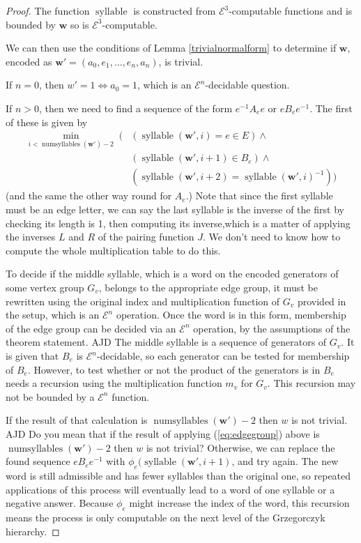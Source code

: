 \documentclass[a4paper]{article}
\newcommand{\grz}[1]{$\mathcal{E}^{#1}$}	%
\newcommand{\wvec}{\mathbf{w}}	%
\theoremstyle{plain}
\theoremstyle{definition}
\newenvironment{ad}{\noindent\color{blue} AJD }{}
\newcommand{\ajd}[1]{
\begin{ad} #1 \end{ad}}
\begin{document}
\begin{proof}
The function $\operatorname{syllable}$ is constructed from \grz{3}-computable functions and is bounded by $\wvec$ so is \grz{3}-computable.

We can then use the conditions of Lemma \ref{trivialnormalform} to determine if $\wvec$, encoded as $\wvec' = (a_0,e_1, \dots, e_n, a_n)$, is trivial.

If $n=0$, then $w'=1 \Leftrightarrow a_0=1$, which is an \grz{n}-decidable question.

If $n>0$, then we need to find a sequence of the form $e^{-1}A_ee$ or $eB_ee^{-1}$. The first of these is given by
\begin{equation}\label{eq:edgegroup}
\begin{split}
	\min_{i < \operatorname{numsyllables}(\wvec')-2} \; (
		&  (\operatorname{syllable}(\wvec',i) = e \in E) \wedge \\ 
		& ( \operatorname{syllable}(\wvec',i+1) \in B_e ) \wedge \\ 
		& ( \operatorname{syllable}(\wvec',i+2) = \operatorname{syllable}(\wvec',i)^{-1} ) 
	)
\end{split} 
\end{equation}
(and the same the other way round for $A_e$.) Note that since the first syllable must be an edge letter, we can say the last syllable is the inverse of the first by checking its length is 1, then computing its inverse,which is a matter of applying the inverses $L$ and $R$ of the pairing function $J$. We don't need to know how to compute the whole multiplication table to do this.

To decide if the middle syllable, which is a word on the encoded generators of some vertex group $G_v$, belongs to the appropriate edge group, it must be rewritten using the original index and multiplication function of $G_v$ provided in the setup, which is an \grz{n} operation. Once the word is in this form, membership of the edge group can be decided via an \grz{n} operation, by the assumptions of the theorem statement. \ajd{The middle syllable is a sequence 
of generators  of $G_v$. It is given that $B_e$ is \grz{n}-decidable, so
each generator can be tested for membership of $B_e$. However, to
test whether or not the product of the generators is in $B_e$ needs
a recursion using the multiplication function $m_v$ for $G_v$. This
recursion may not be bounded by a \grz{n} function.}

If the result of that calculation is $\operatorname{numsyllables}(\wvec')-2$ then $w$ is not trivial. \ajd{Do you mean that if the result of applying 
(\ref{eq:edgegroup}) 
above is $\operatorname{numsyllables}(\wvec')-2$ then $w$ is not trivial?} 
Otherwise, we can replace the found sequence $eB_ee^{-1}$ with $\phi_e(\operatorname{syllable}(\wvec',i+1)$, and try again. The new word is still admissible and has fewer syllables than the original one, so repeated applications of this process will eventually lead to a word of one syllable or a negative answer. Because $\phi_e$ might increase the index of the word, this recursion means the process is only computable on the next level of the Grzegorczyk hierarchy.


\end{proof}
\end{document}
